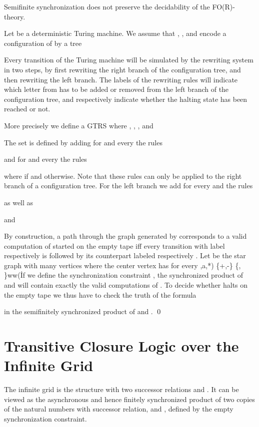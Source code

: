 \documentclass{LMCS}
\begin{document}
{\begin{thm}\label{theo:semi-undec}
Semifinite synchronization does not preserve the decidability of 
the FO(R)-theory.
\end{thm}

\proof
Let  be a deterministic Turing machine.
We assume that , ,   and
encode a configuration  of  
by a tree 

Every transition of the Turing machine will be simulated by the
rewriting system in two steps, by first rewriting the right branch of
the configuration tree, and then rewriting the left branch.
The labels of the rewriting rules will indicate which letter from 
 has to be added  or removed  from the left branch of
the configuration tree, and  respectively  indicate
whether the halting state has been reached or not.

More precisely we define a GTRS 
where , , ,
 and

The set  is defined by adding for  and 
every  the rules


and for   and every  the rules

where  if  and  otherwise. Note that these rules can only be applied to the
right branch of a configuration tree. For the left branch we add for every  and
 the rules 

as well as 

and

By construction, a path through the graph  generated by  corresponds to a valid computation of 
started on the empty tape iff every transition with label  respectively  is followed by its 
counterpart labeled   respectively . Let  be the star graph with 
 many vertices where the center vertex  has  for every ,a,*) \in \{+,-\} \times 
\Gamma \times\{\bot, \top\}ww(\. 
If we define the synchronization constraint , the
synchronized product of  and  will contain exactly the valid computations of . To decide
whether  halts on the empty tape we thus have to check the truth of the formula 

in the semifinitely synchronized product of  and .
\qed

\section{Transitive Closure Logic over the Infinite Grid}

The infinite grid is the structure 
with two successor relations  and . It can be viewed 
as the asynchronous and hence finitely synchronized product of two copies
of the natural numbers with successor relation,  and 
, defined by the empty synchronization constraint.

}
\end{document}
